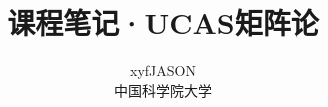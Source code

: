 \documentclass{article}
\theoremstyle{definition}
\theoremstyle{definition}
\theoremstyle{remark}
\begin{document}

\title{课程笔记·UCAS矩阵论}
\author{xyfJASON\\中国科学院大学}
\date{}

\maketitle
\tableofcontents
\pagebreak

 \pagebreak
 \pagebreak
 \pagebreak
 \pagebreak
 \pagebreak
 \pagebreak

\nocite{*}



\end{document}
